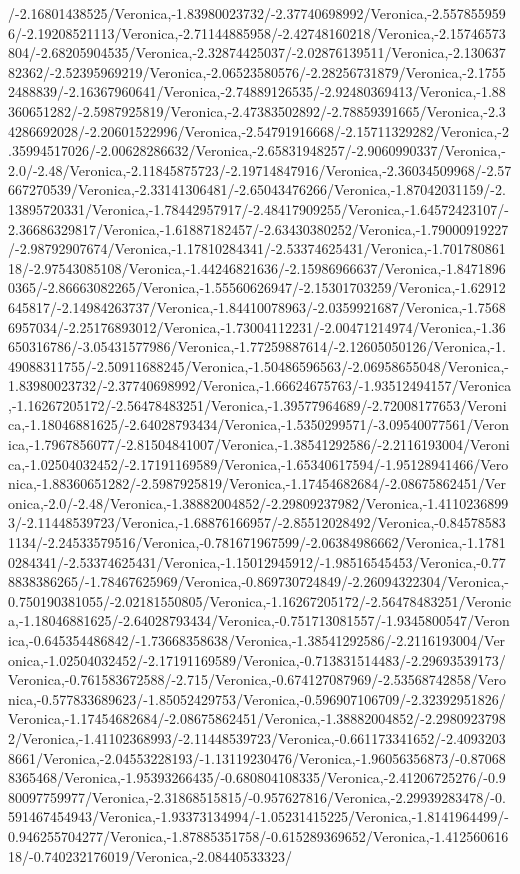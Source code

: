 {\begin{tikzternal}
/-2.16801438525/Veronica,-1.83980023732/-2.37740698992/Veronica,-2.5578559596/-2.19208521113/Veronica,-2.71144885958/-2.42748160218/Veronica,-2.15746573804/-2.68205904535/Veronica,-2.32874425037/-2.02876139511/Veronica,-2.13063782362/-2.52395969219/Veronica,-2.06523580576/-2.28256731879/Veronica,-2.17552488839/-2.16367960641/Veronica,-2.74889126535/-2.92480369413/Veronica,-1.88360651282/-2.5987925819/Veronica,-2.47383502892/-2.78859391665/Veronica,-2.34286692028/-2.20601522996/Veronica,-2.54791916668/-2.15711329282/Veronica,-2.35994517026/-2.00628286632/Veronica,-2.65831948257/-2.9060990337/Veronica,-2.0/-2.48/Veronica,-2.11845875723/-2.19714847916/Veronica,-2.36034509968/-2.57667270539/Veronica,-2.33141306481/-2.65043476266/Veronica,-1.87042031159/-2.13895720331/Veronica,-1.78442957917/-2.48417909255/Veronica,-1.64572423107/-2.36686329817/Veronica,-1.61887182457/-2.63430380252/Veronica,-1.79000919227/-2.98792907674/Veronica,-1.17810284341/-2.53374625431/Veronica,-1.70178086118/-2.97543085108/Veronica,-1.44246821636/-2.15986966637/Veronica,-1.84718960365/-2.86663082265/Veronica,-1.55560626947/-2.15301703259/Veronica,-1.62912645817/-2.14984263737/Veronica,-1.84410078963/-2.0359921687/Veronica,-1.75686957034/-2.25176893012/Veronica,-1.73004112231/-2.00471214974/Veronica,-1.36650316786/-3.05431577986/Veronica,-1.77259887614/-2.12605050126/Veronica,-1.49088311755/-2.50911688245/Veronica,-1.50486596563/-2.06958655048/Veronica,-1.83980023732/-2.37740698992/Veronica,-1.66624675763/-1.93512494157/Veronica,-1.16267205172/-2.56478483251/Veronica,-1.39577964689/-2.72008177653/Veronica,-1.18046881625/-2.64028793434/Veronica,-1.5350299571/-3.09540077561/Veronica,-1.7967856077/-2.81504841007/Veronica,-1.38541292586/-2.2116193004/Veronica,-1.02504032452/-2.17191169589/Veronica,-1.65340617594/-1.95128941466/Veronica,-1.88360651282/-2.5987925819/Veronica,-1.17454682684/-2.08675862451/Veronica,-2.0/-2.48/Veronica,-1.38882004852/-2.29809237982/Veronica,-1.41102368993/-2.11448539723/Veronica,-1.68876166957/-2.85512028492/Veronica,-0.845785831134/-2.24533579516/Veronica,-0.781671967599/-2.06384986662/Veronica,-1.17810284341/-2.53374625431/Veronica,-1.15012945912/-1.98516545453/Veronica,-0.778838386265/-1.78467625969/Veronica,-0.869730724849/-2.26094322304/Veronica,-0.750190381055/-2.02181550805/Veronica,-1.16267205172/-2.56478483251/Veronica,-1.18046881625/-2.64028793434/Veronica,-0.751713081557/-1.9345800547/Veronica,-0.645354486842/-1.73668358638/Veronica,-1.38541292586/-2.2116193004/Veronica,-1.02504032452/-2.17191169589/Veronica,-0.713831514483/-2.29693539173/Veronica,-0.761583672588/-2.715/Veronica,-0.674127087969/-2.53568742858/Veronica,-0.577833689623/-1.85052429753/Veronica,-0.596907106709/-2.32392951826/Veronica,-1.17454682684/-2.08675862451/Veronica,-1.38882004852/-2.29809237982/Veronica,-1.41102368993/-2.11448539723/Veronica,-0.661173341652/-2.40932038661/Veronica,-2.04553228193/-1.13119230476/Veronica,-1.96056356873/-0.870688365468/Veronica,-1.95393266435/-0.680804108335/Veronica,-2.41206725276/-0.980097759977/Veronica,-2.31868515815/-0.957627816/Veronica,-2.29939283478/-0.591467454943/Veronica,-1.93373134994/-1.05231415225/Veronica,-1.8141964499/-0.946255704277/Veronica,-1.87885351758/-0.615289369652/Veronica,-1.41256061618/-0.740232176019/Veronica,-2.08440533323/
\end{tikzternal}}
